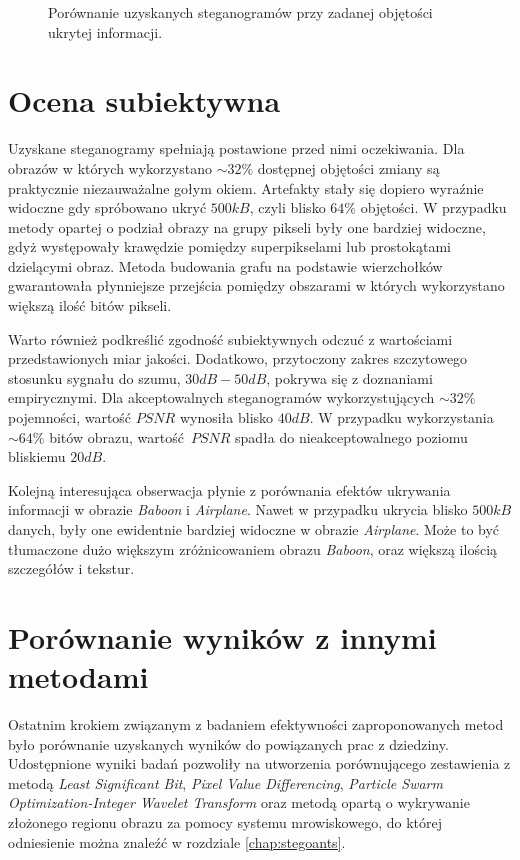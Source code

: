 {{{\begin{figure}
                \caption[Porównanie rezultatów]
                {Porównanie uzyskanych steganogramów przy zadanej objętości ukrytej informacji.}
                \label{fig:exp-edge-results}
            \end{figure}
        }
    }

    \section{Ocena subiektywna}
    {
        Uzyskane steganogramy spełniają postawione przed nimi oczekiwania. Dla obrazów w których wykorzystano $\sim
        32\%$ dostępnej objętości zmiany są praktycznie niezauważalne gołym okiem. Artefakty stały się dopiero wyraźnie
        widoczne gdy spróbowano ukryć $500kB$, czyli blisko $64\%$ objętości. W przypadku metody opartej o podział
        obrazy na grupy pikseli były one bardziej widoczne, gdyż występowały krawędzie pomiędzy superpikselami lub
        prostokątami dzielącymi obraz. Metoda budowania grafu na podstawie wierzchołków gwarantowała płynniejsze
        przejścia pomiędzy obszarami w których wykorzystano większą ilość bitów pikseli.

        Warto również podkreślić zgodność subiektywnych odczuć z wartościami przedstawionych miar jakości. Dodatkowo,
        przytoczony zakres szczytowego stosunku sygnału do szumu, $30dB -50dB$, pokrywa się z doznaniami empirycznymi.
        Dla akceptowalnych steganogramów wykorzystujących $\sim 32\%$ pojemności, wartość $PSNR$ wynosiła blisko $40dB$.
        W przypadku wykorzystania $\sim 64\%$ bitów obrazu, wartość $PSNR$ spadła do nieakceptowalnego poziomu bliskiemu
        $20dB$.

        Kolejną interesująca obserwacja płynie z porównania efektów ukrywania informacji w obrazie \textit{Baboon} i
        \textit{Airplane}. Nawet w przypadku ukrycia blisko $500kB$ danych, były one ewidentnie bardziej widoczne w
        obrazie \textit{Airplane}. Może to być tłumaczone dużo większym zróżnicowaniem obrazu \textit{Baboon}, oraz
        większą ilością szczegółów i tekstur.
    }

    \section{Porównanie wyników z innymi metodami}
    {
        Ostatnim krokiem związanym z badaniem efektywności zaproponowanych metod było porównanie uzyskanych wyników do
        powiązanych prac z dziedziny. Udostępnione wyniki badań pozwoliły na utworzenia porównującego zestawienia z
        metodą \textit{Least Significant Bit}\cite{Solak2018LSBSA}, \textit{Pixel Value
        Differencing}\cite{Solak2018LSBSA}, \textit{Particle Swarm Optimization-Integer Wavelet
        Transform}\cite{Muhuri2020ANI} oraz metodą opartą o wykrywanie złożonego regionu obrazu za pomocy systemu
        mrowiskowego\cite{Khan2018AntCO}, do której odniesienie można znaleźć w rozdziale \ref{chap:stegoants}.

}}
